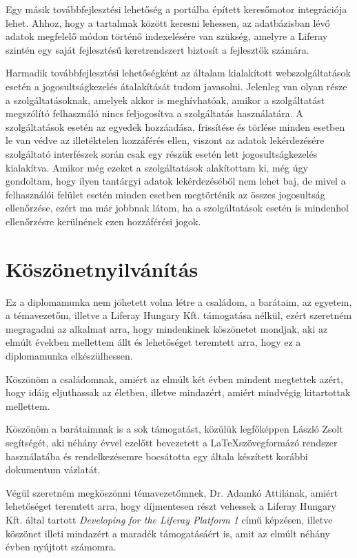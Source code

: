\documentclass[hidelinks, 12pt, a4paper]{report}
\begin{document}
Egy másik továbbfejlesztési lehetőség a portálba épített keresőmotor integrációja lehet. Ahhoz, hogy a tartalmak között keresni lehessen, az adatbázisban lévő adatok megfelelő módon történő indexelésére van szükség, amelyre a Liferay szintén egy saját fejlesztésű keretrendszert biztosít a fejlesztők számára.

Harmadik továbbfejlesztési lehetőségként az általam kialakított webszolgáltatások esetén a jogosultságkezelés átalakítását tudom javasolni. Jelenleg van olyan része a szolgáltatásoknak, amelyek akkor is meghívhatóak, amikor a szolgáltatást megszólító felhasználó nincs feljogosítva a szolgáltatás használatára. A szolgáltatások esetén az egyedek hozzáadása, frissítése és törlése minden esetben le van védve az illetéktelen hozzáférés ellen, viszont az adatok lekérdezésére szolgáltató interfészek során csak egy részük esetén lett jogosultságkezelés kialakítva. Amikor még ezeket a szolgáltatások alakítottam ki, még úgy gondoltam, hogy ilyen tantárgyi adatok lekérdezéséből nem lehet baj, de mivel a felhasználói felület esetén minden esetben megtörténik az összes jogosultság ellenőrzése, ezért ma már jobbnak látom, ha a szolgáltatások esetén is mindenhol ellenőrzésre kerülnének ezen hozzáférési jogok.

\clearpage
{}
\chapter*{Köszönetnyilvánítás}

Ez a diplomamunka nem jöhetett volna létre a családom, a barátaim, az egyetem, a témavezetőm, illetve a Liferay Hungary Kft. támogatása nélkül, ezért szeretném megragadni az alkalmat arra, hogy mindenkinek köszönetet mondjak, aki az elmúlt években mellettem állt és lehetőséget teremtett arra, hogy ez a diplomamunka elkészülhessen.

Köszönöm a családomnak, amiért az elmúlt két évben mindent megtettek azért, hogy idáig eljuthassak az életben, illetve mindazért, amiért mindvégig kitartottak mellettem.

Köszönöm a barátaimnak is a sok támogatást, közülük legfőképpen László Zsolt segítségét, aki néhány évvel ezelőtt bevezetett a \LaTeX szövegformázó rendszer használatába és rendelkezésemre bocsátotta egy általa készített korábbi dokumentum vázlatát.

Végül szeretném megköszönni témavezetőmnek, Dr. Adamkó Attilának, amiért lehetőséget teremtett arra, hogy díjmentesen részt vehessek a Liferay Hungary Kft. által tartott \emph{Developing for the Liferay Platform 1} című képzésen, illetve köszönet illeti mindazért a maradék támogatásáért is, amit az elmúlt néhány évben nyújtott számomra.
\end{document}
